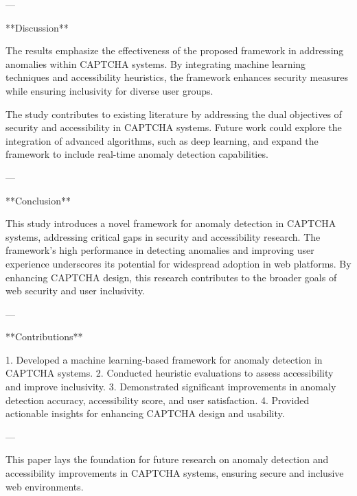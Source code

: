 ---

**Discussion**

The results emphasize the effectiveness of the proposed framework in addressing anomalies within CAPTCHA systems. By integrating machine learning techniques and accessibility heuristics, the framework enhances security measures while ensuring inclusivity for diverse user groups.

The study contributes to existing literature by addressing the dual objectives of security and accessibility in CAPTCHA systems. Future work could explore the integration of advanced algorithms, such as deep learning, and expand the framework to include real-time anomaly detection capabilities.

---

**Conclusion**

This study introduces a novel framework for anomaly detection in CAPTCHA systems, addressing critical gaps in security and accessibility research. The framework's high performance in detecting anomalies and improving user experience underscores its potential for widespread adoption in web platforms. By enhancing CAPTCHA design, this research contributes to the broader goals of web security and user inclusivity.

---

**Contributions**

1. Developed a machine learning-based framework for anomaly detection in CAPTCHA systems.
2. Conducted heuristic evaluations to assess accessibility and improve inclusivity.
3. Demonstrated significant improvements in anomaly detection accuracy, accessibility score, and user satisfaction.
4. Provided actionable insights for enhancing CAPTCHA design and usability.

--- 

This paper lays the foundation for future research on anomaly detection and accessibility improvements in CAPTCHA systems, ensuring secure and inclusive web environments.